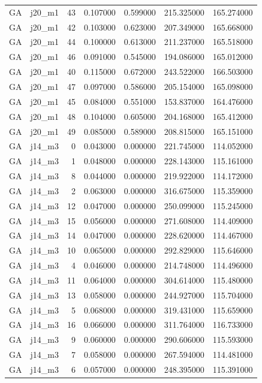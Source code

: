 \begin{tabular}{llrrrrr}
GA & j20_m1 & 43 & 0.107000 & 0.599000 & 215.325000 & 165.274000 \\
GA & j20_m1 & 42 & 0.103000 & 0.623000 & 207.349000 & 165.668000 \\
GA & j20_m1 & 44 & 0.100000 & 0.613000 & 211.237000 & 165.518000 \\
GA & j20_m1 & 46 & 0.091000 & 0.545000 & 194.086000 & 165.012000 \\
GA & j20_m1 & 40 & 0.115000 & 0.672000 & 243.522000 & 166.503000 \\
GA & j20_m1 & 47 & 0.097000 & 0.586000 & 205.154000 & 165.098000 \\
GA & j20_m1 & 45 & 0.084000 & 0.551000 & 153.837000 & 164.476000 \\
GA & j20_m1 & 48 & 0.104000 & 0.605000 & 204.168000 & 165.412000 \\
GA & j20_m1 & 49 & 0.085000 & 0.589000 & 208.815000 & 165.151000 \\
GA & j14_m3 & 0 & 0.043000 & 0.000000 & 221.745000 & 114.052000 \\
GA & j14_m3 & 1 & 0.048000 & 0.000000 & 228.143000 & 115.161000 \\
GA & j14_m3 & 8 & 0.044000 & 0.000000 & 219.922000 & 114.172000 \\
GA & j14_m3 & 2 & 0.063000 & 0.000000 & 316.675000 & 115.359000 \\
GA & j14_m3 & 12 & 0.047000 & 0.000000 & 250.099000 & 115.245000 \\
GA & j14_m3 & 15 & 0.056000 & 0.000000 & 271.608000 & 114.409000 \\
GA & j14_m3 & 14 & 0.047000 & 0.000000 & 228.620000 & 114.467000 \\
GA & j14_m3 & 10 & 0.065000 & 0.000000 & 292.829000 & 115.646000 \\
GA & j14_m3 & 4 & 0.046000 & 0.000000 & 214.748000 & 114.496000 \\
GA & j14_m3 & 11 & 0.064000 & 0.000000 & 304.614000 & 115.480000 \\
GA & j14_m3 & 13 & 0.058000 & 0.000000 & 244.927000 & 115.704000 \\
GA & j14_m3 & 5 & 0.068000 & 0.000000 & 319.431000 & 115.659000 \\
GA & j14_m3 & 16 & 0.066000 & 0.000000 & 311.764000 & 116.733000 \\
GA & j14_m3 & 9 & 0.060000 & 0.000000 & 290.606000 & 115.593000 \\
GA & j14_m3 & 7 & 0.058000 & 0.000000 & 267.594000 & 114.481000 \\
GA & j14_m3 & 6 & 0.057000 & 0.000000 & 248.395000 & 115.391000 \\

\end{tabular}
